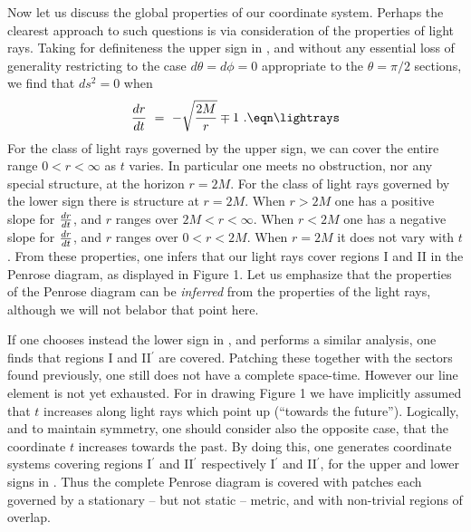 
Now let us discuss the global properties of our coordinate system.
Perhaps the clearest approach to such questions is via
consideration of the properties
of light rays.  Taking for definiteness the upper sign in \nicemetric ,
and without any essential
loss of generality restricting to the case
$d\theta = d\phi =0$ appropriate to the $\theta = \pi/2$ sections,
we find that $ds^2=0$ when
$$
{dr\over dt } ~=~ - \sqrt {2M\over r } \mp 1~.
\eqn\lightrays
$$
For the class of light rays governed by
the upper sign, we can cover the
entire range $0 < r < \infty $ as $t$ varies.  In particular one
meets
no obstruction, nor any special structure,
at the horizon $r=2M$.  For the class of light rays
governed by the lower sign there is structure at $r=2M$.
When $r > 2M$ one has a positive slope for ${dr\over dt}$, and
$r$ ranges over $2M < r < \infty$.  When $r < 2M$ one has a negative
slope for ${dr\over dt}$, and $r$ ranges over $0 < r < 2M$.
When $r = 2M$ it does not vary with $t$.  From these properties, one
infers that our light rays cover regions I and II in the Penrose
diagram, as displayed in Figure 1.  Let us emphasize that the
properties of the Penrose diagram can be {\it inferred\/} from the
properties of the light rays, although we will not belabor that
point here.




If one chooses instead the lower sign in \nicemetric , and performs
a similar analysis, one finds that regions I and II$^\prime$
are covered.
Patching these together with the sectors found previously,
one still does not have a complete space-time.
However our line element is not yet exhausted.  For in drawing
Figure 1 we have implicitly assumed that $t$ increases along light
rays which point up (``towards the future'').  Logically, and to
maintain symmetry, one should
consider also the opposite case, that the coordinate
$t$ increases towards the past.  By doing this, one generates
coordinate systems covering regions
I$^\prime$ and II$^\prime$
respectively I$^\prime$ and II$^\prime$,
for the upper and lower signs
in \nicemetric .   Thus the complete Penrose diagram is covered
with patches each governed by a stationary -- but not static --
metric, and with non-trivial regions of overlap.


